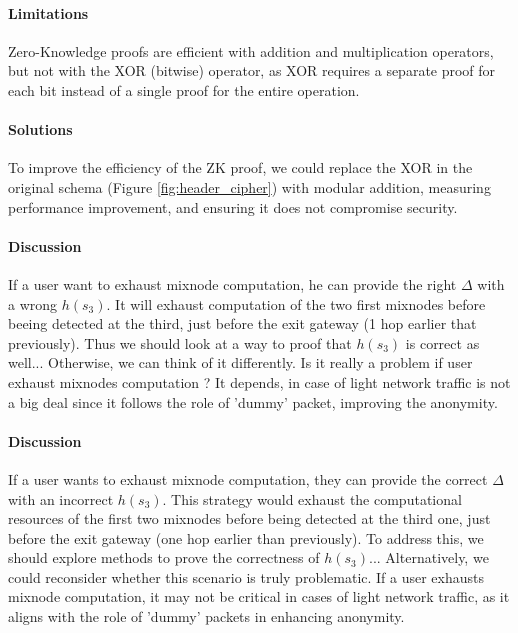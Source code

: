 \paragraph{Limitations} Zero-Knowledge proofs are efficient with addition and multiplication operators, but not with the XOR (bitwise) operator, as XOR requires a separate proof for each bit instead of a single proof for the entire operation.

\paragraph{Solutions} To improve the efficiency of the ZK proof, we could replace the XOR in the original schema (Figure \ref{fig:header_cipher}) with modular addition, measuring performance improvement, and ensuring it does not compromise security.

\paragraph{Discussion} If a user want to exhaust mixnode computation, he can provide the right $\Delta$ with a wrong $h(s_3)$. It will exhaust computation of the two first mixnodes before beeing detected at the third, just before the exit gateway (1 hop earlier that previously).
Thus we should look at a way to proof that $h(s_3)$ is correct as well... %
Otherwise, we can think of it differently. Is it really a problem if user exhaust mixnodes computation ? It depends, in case of light network traffic is not a big deal since it follows the role of 'dummy' packet, improving the anonymity.

\paragraph{Discussion} If a user wants to exhaust mixnode computation, they can provide the correct $\Delta$ with an incorrect $h(s_3)$. This strategy would exhaust the computational resources of the first two mixnodes before being detected at the third one, just before the exit gateway (one hop earlier than previously).
To address this, we should explore methods to prove the correctness of $h(s_3)$...  %
Alternatively, we could reconsider whether this scenario is truly problematic. If a user exhausts mixnode computation, it may not be critical in cases of light network traffic, as it aligns with the role of 'dummy' packets in enhancing anonymity.

